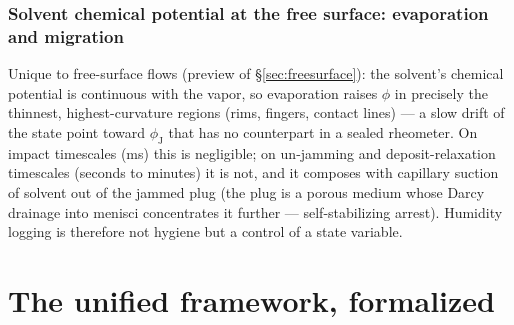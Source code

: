 \documentclass[11pt]{article}
\newcommand{\phiJ}{\phi_{\mathrm{J}}}
\begin{document}
\subsubsection{Solvent chemical potential at the free surface: evaporation and migration}
Unique to free-surface flows (preview of \S\ref{sec:freesurface}): the solvent's chemical potential is continuous with the vapor, so evaporation raises $\phi$ in precisely the thinnest, highest-curvature regions (rims, fingers, contact lines) --- a slow drift of the state point toward $\phiJ$ that has no counterpart in a sealed rheometer. On impact timescales (ms) this is negligible; on un-jamming and deposit-relaxation timescales (seconds to minutes) it is not, and it composes with capillary suction of solvent out of the jammed plug (the plug is a porous medium whose Darcy drainage into menisci concentrates it further --- self-stabilizing arrest). Humidity logging is therefore not hygiene but a control of a state variable.

\section{The unified framework, formalized}
\label{sec:unified}
\end{document}

